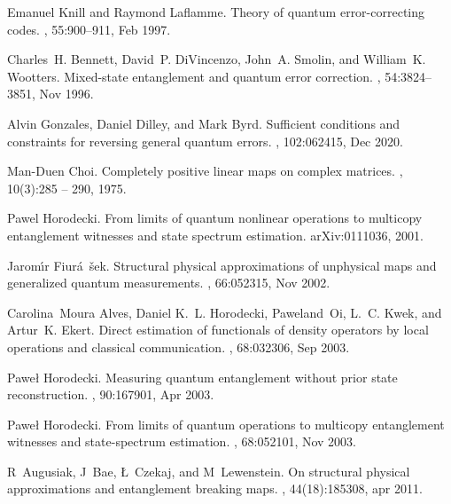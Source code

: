 \documentclass[12pt]{iopart}
\begin{document}
\begin{thebibliography}{10}
Emanuel Knill and Raymond Laflamme.
\newblock Theory of quantum error-correcting codes.
, 55:900--911, Feb 1997.

Charles~H. Bennett, David~P. DiVincenzo, John~A. Smolin, and William~K.
  Wootters.
\newblock Mixed-state entanglement and quantum error correction.
, 54:3824--3851, Nov 1996.

Alvin Gonzales, Daniel Dilley, and Mark Byrd.
\newblock Sufficient conditions and constraints for reversing general quantum
  errors.
, 102:062415, Dec 2020.

Man-Duen Choi.
\newblock Completely positive linear maps on complex matrices.
, 10(3):285 -- 290, 1975.

Pawel Horodecki.
\newblock From limits of quantum nonlinear operations to multicopy entanglement
  witnesses and state spectrum estimation.
\newblock arXiv:0111036, 2001.

Jarom\'{\i}r Fiur\'a\ifmmode~\else \v{s}\fi{}ek.
\newblock Structural physical approximations of unphysical maps and generalized
  quantum measurements.
, 66:052315, Nov 2002.

Carolina~Moura Alves, Daniel K.~L. Horodecki, Paweland~Oi, L.~C. Kwek, and
  Artur~K. Ekert.
\newblock Direct estimation of functionals of density operators by local
  operations and classical communication.
, 68:032306, Sep 2003.

Pawe\l{} Horodecki.
\newblock Measuring quantum entanglement without prior state reconstruction.
, 90:167901, Apr 2003.

Pawe\l{} Horodecki.
\newblock From limits of quantum operations to multicopy entanglement witnesses
  and state-spectrum estimation.
, 68:052101, Nov 2003.

R~Augusiak, J~Bae, {\L}~Czekaj, and M~Lewenstein.
\newblock On structural physical approximations and entanglement breaking maps.
,
  44(18):185308, apr 2011.


\end{thebibliography}
\end{document}
